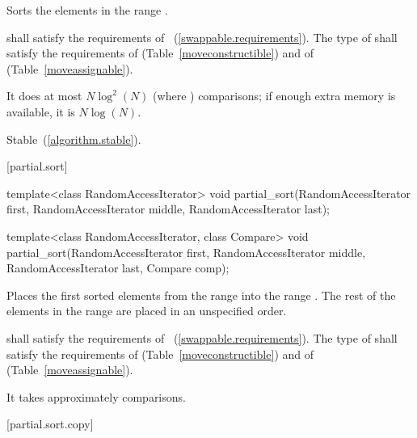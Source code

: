 \begin{itemdescr}
\pnum
\effects
Sorts the elements in the range .

\pnum
\requires
{} shall satisfy the requirements of
~(\ref{swappable.requirements}). The type
of  shall satisfy the requirements of
 (Table~\ref{moveconstructible}) and of
 (Table~\ref{moveassignable}).


\pnum
\complexity
It does at most $N \log^2(N)$
(where
)
comparisons; if enough extra memory is available, it is
$N \log(N)$.

\pnum
\remarks Stable~(\ref{algorithm.stable}).
\end{itemdescr}

[partial.sort]{}

%
\begin{itemdecl}
template<class RandomAccessIterator>
  void partial_sort(RandomAccessIterator first,
                    RandomAccessIterator middle,
                    RandomAccessIterator last);

template<class RandomAccessIterator, class Compare>
  void partial_sort(RandomAccessIterator first,
                    RandomAccessIterator middle,
                    RandomAccessIterator last,
                    Compare comp);
\end{itemdecl}

\begin{itemdescr}
\pnum
\effects
Places the first
sorted elements from the range
into the range
.
The rest of the elements in the range
are placed in an unspecified order.
%

\pnum
\requires
{} shall satisfy the requirements of
~(\ref{swappable.requirements}). The type
of  shall satisfy the requirements of
 (Table~\ref{moveconstructible}) and of
 (Table~\ref{moveassignable}).


\pnum
\complexity
It takes approximately
comparisons.
\end{itemdescr}

[partial.sort.copy]{}

